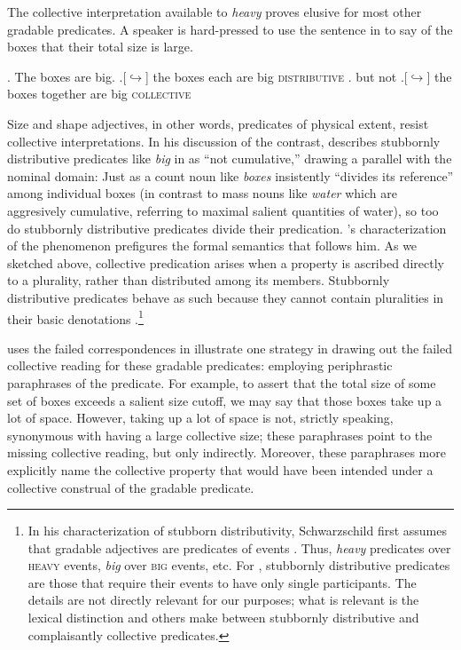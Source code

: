\documentclass[linguex]{sp}
\begin{document}
The collective interpretation available to \emph{heavy} proves elusive for most other gradable predicates. A speaker is hard-pressed to use the sentence in \Next to say of the boxes that their total size is large.

\ex. The boxes are big.
\a.[$\hookrightarrow$] the boxes each are big \hfill \textsc{distributive}
\z. but not
\a.[$\hookrightarrow$] the boxes together are big \hfill \textsc{collective}

Size and shape adjectives, in other words, predicates of physical extent, resist collective interpretations. In his discussion of the contrast, \citet{quine1960} describes stubbornly distributive predicates like \emph{big} in \Last as ``not cumulative,'' drawing a parallel with the nominal domain: Just as a count noun like \emph{boxes} insistently ``divides its reference'' among individual boxes (in contrast to mass nouns like \emph{water} which are aggresively cumulative, referring to maximal salient quantities of water), so too do stubbornly distributive predicates divide their predication. \citeauthor{quine1960}'s characterization of the phenomenon prefigures the formal semantics that follows him. As we sketched above, collective predication arises when a property is ascribed directly to a plurality, rather than distributed among its members. Stubbornly distributive predicates behave as such because they cannot contain pluralities in their basic denotations \citep{schwarzschild2011,vazquezrojas2012,zhang2013}.\footnote{In his characterization of stubborn distributivity, Schwarzschild first assumes that gradable adjectives are predicates of events \citep[e.g.,][]{higginbothamschein1989}. Thus, \emph{heavy} predicates over \textsc{heavy} events, \emph{big} over \textsc{big} events, etc. For \citeauthor{schwarzschild2011}, stubbornly distributive predicates are those that require their events to have only single participants. The details are not directly relevant for our purposes; what is relevant is the lexical distinction \citeauthor{schwarzschild2011} and others make between stubbornly distributive and complaisantly collective predicates.}

\citet{schwarzschild2011} uses the failed correspondences in \Next illustrate one strategy in drawing out the failed collective reading for these gradable predicates: employing periphrastic paraphrases of the predicate. For example, to assert that the total size of some set of boxes exceeds a salient size cutoff, we may say that those boxes take up a lot of space. However, taking up a lot of space is not, strictly speaking, synonymous with having a large collective size; these paraphrases point to the missing collective reading, but only indirectly. Moreover, these paraphrases more explicitly name the collective property that would have been intended under a collective construal of the gradable predicate.\\
\end{document}
